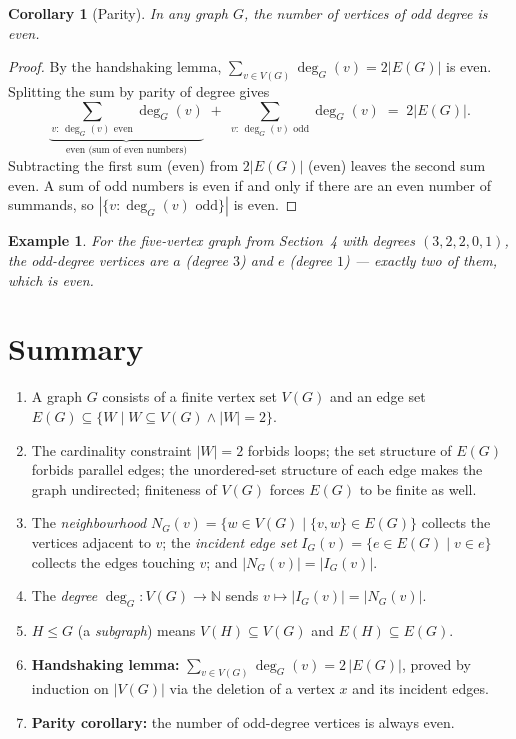 \documentclass[11pt]{article}
\theoremstyle{defstyle}
\theoremstyle{thmstyle}
\newtheorem{corollary}[theorem]{Corollary}
\theoremstyle{notstyle}
\newtheorem*{example}{Example}
\theoremstyle{cautionstyle}
\newcommand{\N}{\mathbb{N}}
\begin{document}
\begin{thmbox}
\begin{corollary}[Parity]
In any graph $G$, the number of vertices of odd degree is even.
\end{corollary}
\end{thmbox}

\begin{proof}
By the handshaking lemma, $\sum_{v \in V(G)} \deg_G(v) = 2|E(G)|$ is even.
Splitting the sum by parity of degree gives
\[
  \underbrace{\sum_{v:\,\deg_G(v) \text{ even}} \deg_G(v)}_{\text{even (sum of even numbers)}}
  \;+\;
  \sum_{v:\,\deg_G(v) \text{ odd}} \deg_G(v)
  \;=\; 2|E(G)|.
\]
Subtracting the first sum (even) from $2|E(G)|$ (even) leaves the second
sum even. A sum of odd numbers is even if and only if there are an even
number of summands, so $|\{v : \deg_G(v) \text{ odd}\}|$ is even.
\end{proof}

\begin{notebox}
\begin{example}
For the five-vertex graph from Section~4 with degrees
$(3, 2, 2, 0, 1)$, the odd-degree vertices are $a$ (degree $3$) and $e$
(degree $1$) --- exactly two of them, which is even. \checkmark
\end{example}
\end{notebox}

\section{Summary}

\begin{enumerate}[leftmargin=2em, itemsep=2pt]
  \item A graph $G$ consists of a finite vertex set $V(G)$ and an edge set
        $E(G) \subseteq \{ W \mid W \subseteq V(G) \wedge |W| = 2 \}$.
  \item The cardinality constraint $|W| = 2$ forbids loops; the set
        structure of $E(G)$ forbids parallel edges; the unordered-set
        structure of each edge makes the graph undirected; finiteness of
        $V(G)$ forces $E(G)$ to be finite as well.
  \item The \emph{neighbourhood} $N_G(v) = \{w \in V(G) \mid \{v,w\} \in E(G)\}$
        collects the vertices adjacent to $v$; the \emph{incident edge
        set} $I_G(v) = \{e \in E(G) \mid v \in e\}$ collects the edges
        touching $v$; and $|N_G(v)| = |I_G(v)|$.
  \item The \emph{degree} $\deg_G \colon V(G) \to \N$ sends
        $v \mapsto |I_G(v)| = |N_G(v)|$.
  \item $H \leq G$ (a \emph{subgraph}) means $V(H) \subseteq V(G)$ and
        $E(H) \subseteq E(G)$.
  \item \textbf{Handshaking lemma:} $\displaystyle\sum_{v \in V(G)}
        \deg_G(v) = 2\,|E(G)|$, proved by induction on $|V(G)|$ via the
        deletion of a vertex $x$ and its incident edges.
  \item \textbf{Parity corollary:} the number of odd-degree vertices is
        always even.
\end{enumerate}
\end{document}
